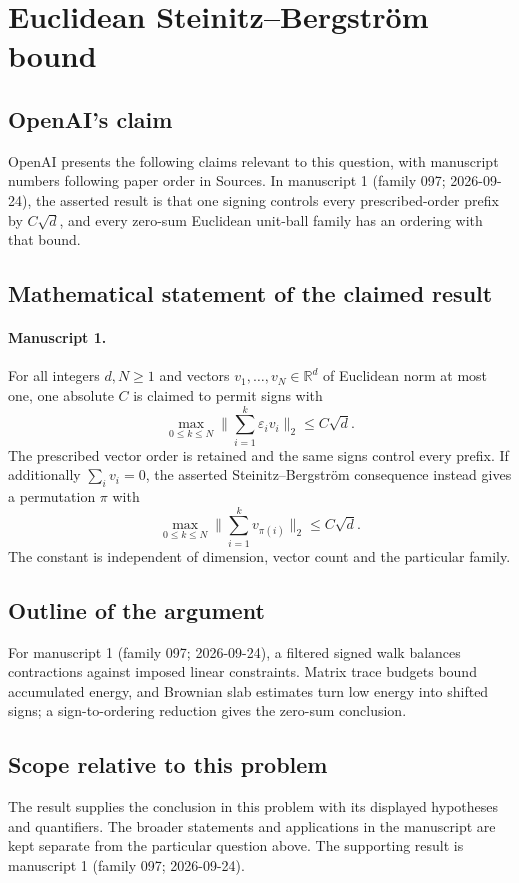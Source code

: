 \documentclass[11pt]{article}
\begin{document}
\section*{Euclidean Steinitz–Bergström bound}

\subsection{OpenAI's claim}
OpenAI presents the following claims relevant to this question, with manuscript numbers following paper order in Sources. In manuscript 1 (family 097; 2026-09-24), the asserted result is that one signing controls every prescribed-order prefix by $C\sqrt d$, and every zero-sum Euclidean unit-ball family has an ordering with that bound.

\subsection{Mathematical statement of the claimed result}
\paragraph{Manuscript 1.}
For all integers $d,N\ge1$ and vectors $v_1,\ldots,v_N\in\mathbb R^d$ of Euclidean norm at most one, one absolute $C$ is claimed to permit signs with
\[
 \max_{0\le k\le N}\|\sum_{i=1}^k\varepsilon_iv_i\|_2\le C\sqrt d.
\]
The prescribed vector order is retained and the same signs control every prefix. If additionally $\sum_iv_i=0$, the asserted Steinitz--Bergstr\"om consequence instead gives a permutation $\pi$ with
\[
 \max_{0\le k\le N}\|\sum_{i=1}^kv_{\pi(i)}\|_2\le C\sqrt d.
\]
The constant is independent of dimension, vector count and the particular family.

\subsection{Outline of the argument}
For manuscript 1 (family 097; 2026-09-24), a filtered signed walk balances contractions against imposed linear constraints. Matrix trace budgets bound accumulated energy, and Brownian slab estimates turn low energy into shifted signs; a sign-to-ordering reduction gives the zero-sum conclusion.

\subsection{Scope relative to this problem}
The result supplies the conclusion in this problem with its displayed hypotheses and quantifiers. The broader statements and applications in the manuscript are kept separate from the particular question above. The supporting result is manuscript 1 (family 097; 2026-09-24).
\end{document}
